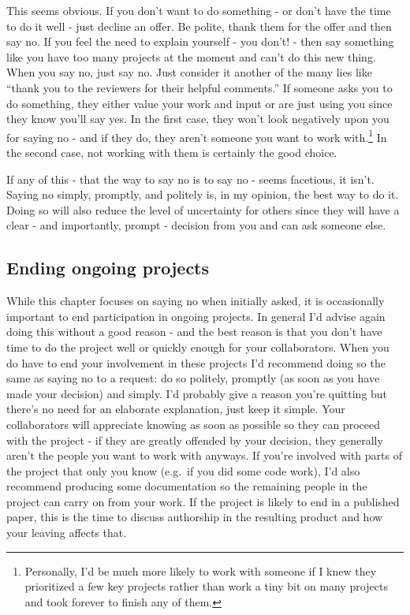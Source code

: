 \documentclass[
  12pt,
  openany]{book}
\begin{document}
This seems obvious. If you don't want to do something - or don't have the time to do it well - just decline an offer. Be polite, thank them for the offer and then say no. If you feel the need to explain yourself - you don't! - then say something like you have too many projects at the moment and can't do this new thing. When you say no, just say no. Just consider it another of the many lies like ``thank you to the reviewers for their helpful comments.'' If someone asks you to do something, they either value your work and input or are just using you since they know you'll say yes. In the first case, they won't look negatively upon you for saying no - and if they do, they aren't someone you want to work with.\footnote{Personally, I'd be much more likely to work with someone if I knew they prioritized a few key projects rather than work a tiny bit on many projects and took forever to finish any of them.} In the second case, not working with them is certainly the good choice.

If any of this - that the way to say no is to say no - seems facetious, it isn't. Saying no simply, promptly, and politely is, in my opinion, the best way to do it. Doing so will also reduce the level of uncertainty for others since they will have a clear - and importantly, prompt - decision from you and can ask someone else.

\hypertarget{ending-ongoing-projects}{%
\subsection{Ending ongoing projects}\label{ending-ongoing-projects}}

While this chapter focuses on saying no when initially asked, it is occasionally important to end participation in ongoing projects. In general I'd advise again doing this without a good reason - and the best reason is that you don't have time to do the project well or quickly enough for your collaborators. When you do have to end your involvement in these projects I'd recommend doing so the same as saying no to a request: do so politely, promptly (as soon as you have made your decision) and simply. I'd probably give a reason you're quitting but there's no need for an elaborate explanation, just keep it simple. Your collaborators will appreciate knowing as soon as possible so they can proceed with the project - if they are greatly offended by your decision, they generally aren't the people you want to work with anyways. If you're involved with parts of the project that only you know (e.g.~if you did some code work), I'd also recommend producing some documentation so the remaining people in the project can carry on from your work. If the project is likely to end in a published paper, this is the time to discuss authorship in the resulting product and how your leaving affects that.
\end{document}
